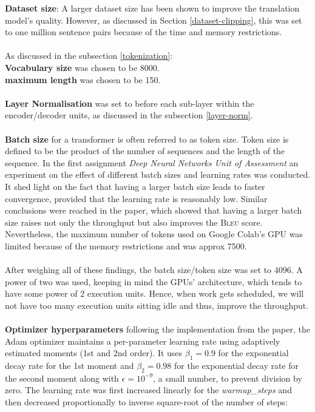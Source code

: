 \documentclass[12pt,a4paper,twoside,openright]{report}
\newcommand{\bleu}{\textsc{Bleu} }
\begin{document}
\textbf{Dataset size}: A larger dataset size has been shown to improve the translation model's quality. However, as discussed in Section \ref{dataset-clipping}, this was set to one million sentence pairs because of the time and memory restrictions.
\\\\
As discussed in the subsection \ref{tokenization}:\\
\textbf{Vocabulary size} was chosen to be 8000.
\\
\textbf{maximum length} was chosen to be 150.
\\\\
\textbf{Layer Normalisation} was set to before each sub-layer within the encoder/decoder units, as discussed in the subsection \ref{layer-norm}.
\\\\
\textbf{Batch size} for a transformer is often referred to as token size. Token size is defined to be the product of the number of sequences and the length of the sequence. In the first assignment \textit{Deep Neural Networks Unit of Assessment} an experiment on the effect of different batch sizes and learning rates was conducted. It shed light on the fact that having a larger batch size leads to faster convergence, provided that the learning rate is reasonably low. Similar conclusions were reached in the paper\cite{training-tips}, which showed that having a larger batch size raises not only the throughput but also improves the \bleu score. Nevertheless, the maximum number of tokens used on Google Colab's GPU was limited because of the memory restrictions and was approx 7500.
\\\\
After weighing all of these findings, the batch size/token size was set to $4096$. A power of two was used, keeping in mind the GPUs' architecture, which tends to have some power of 2 execution units. Hence, when work gets scheduled, we will not have too many execution units sitting idle and thus, improve the throughput.
\\\\
\textbf{Optimizer hyperparameters} following the implementation from the paper\cite{transformers}, the Adam optimizer\cite{adam} maintains a per-parameter learning rate using adaptively estimated moments (1st and 2nd order). It uses $\beta_1 = 0.9$ for the exponential decay rate for the 1st moment and $\beta_2=0.98$ for the exponential decay rate for the second moment along with $\epsilon=10^{-9}$, a small number, to prevent division by zero. The learning rate was first increased linearly for the \textit{warmup\_steps} and then decreased proportionally to inverse square-root of the number of steps:
\end{document}
